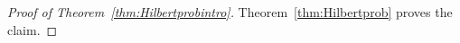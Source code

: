 \documentclass[12pt]{amsart}%
\theoremstyle{definition}%
\begin{document}
\begin{proof}[Proof of Theorem~\ref{thm:Hilbertprobintro}]
  Theorem~\ref{thm:Hilbertprob} proves the claim.
\end{proof}




{}

\end{document}
